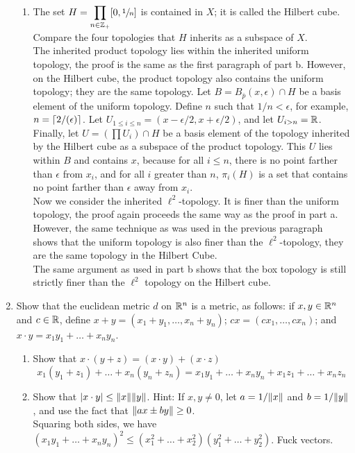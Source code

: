 \documentclass[12pt,letterpaper]{article}
\begin{document}
\begin{enumerate}
\begin{enumerate}
    \item The set $H=\displaystyle\prod_{n\in\mathbb{Z}_+} [0,\sfrac{1}{n}]$ is contained in $X$; it is called the Hilbert cube. Compare the four topologies that $H$ inherits as a subspace of $X$. \\
    The inherited product topology lies within the inherited uniform topology, the proof is the same as the first paragraph of part b. However, on the Hilbert cube, the product topology also contains the uniform topology; they are the same topology. Let $B=B_{\bar{p}}(x,\epsilon)\cap H$ be a basis element of the uniform topology. Define $n$ such that $1/n<\epsilon$, for example, $n=\lceil2/(\epsilon)\rceil$. Let $U_{1\leq i \leq n} = (x-\epsilon/2, x+\epsilon/2)$, and let $U_{i>n} = \mathbb{R}$. Finally, let $U=(\prod U_i) \cap H$ be a basis element of the topology inherited by the Hilbert cube as a subspace of the product topology. This $U$ lies within $B$ and contains $x$, because for all $i\leq n$, there is no point farther than $\epsilon$ from $x_i$, and for all $i$ greater than $n$, $\pi_i(H)$ is a set that contains no point farther than $\epsilon$ away from $x_i$. \\
    Now we consider the inherited $\ell^2$-topology. It is finer than the uniform topology, the proof again proceeds the same way as the proof in part a. However, the same technique as was used in the previous paragraph shows that the uniform topology is also finer than the $\ell^2$-topology, they are the same topology in the Hilbert Cube.\\
    The same argument as used in part b shows that the box topology is still strictly finer than the $\ell^2$ topology on the Hilbert cube.
  \end{enumerate}
  \item Show that the euclidean metric $d$ on $\mathbb{R}^n$ is a metric, as follows: if $x,y\in \mathbb{R}^n$ and $c\in \mathbb{R}$, define $x+y=(x_1+y_1,\dots,x_n+y_n)$; $cx = (cx_1, \dots, cx_n)$; and $x\cdot y = x_1y_1 + \dots + x_ny_n$.\begin{enumerate}
    \item Show that $x\cdot (y+z) = (x\cdot y) + (x\cdot z)$
    $$x_1(y_1+z_1)+\dots + x_n(y_n+z_n) = x_1y_1+\dots+x_ny_n + x_1z_1+\dots+x_nz_n$$
    \item Show that $\lvert x\cdot y\rvert \leq \lVert x\rVert\lVert y\rVert$. Hint: If $x,y \neq 0$, let $a=1/\lVert x\rVert$ and $b=1/\lVert y\rVert$, and use the fact that $\lVert ax\pm by\rVert \geq 0$. \\
    Squaring both sides, we have $(x_1y_1 + \dots + x_ny_n)^2 \leq (x_1^2+\dots+x_2^2)(y_1^2+\dots+y_2^2)$. Fuck vectors. \\

\end{enumerate}
\end{enumerate}
\end{document}
